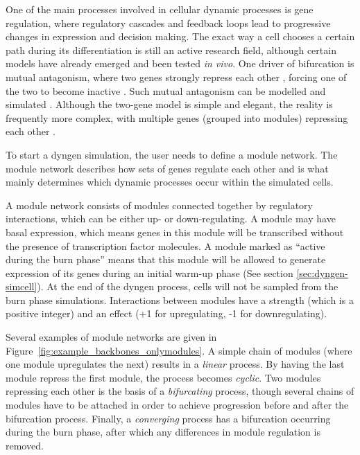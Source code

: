 \documentclass[
  table,
  10pt,
  a4paper]{article}
\begin{document}
One of the main processes involved in cellular dynamic processes is gene
regulation, where regulatory cascades and feedback loops lead to
progressive changes in expression and decision making. The exact way a
cell chooses a certain path during its differentiation is still an
active research field, although certain models have already emerged and
been tested \emph{in vivo}. One driver of bifurcation is mutual
antagonism, where two genes strongly repress each other
\autocite{rekhtman_directinteractionhematopoietic_1999,xu_regulationbifurcatingcell_2015},
forcing one of the two to become inactive
\autocite{graf_forcingcellschange_2009}. Such mutual antagonism can be
modelled and simulated
\autocite{wang_quantifyingwaddingtonlandscape_2011,ferrell_bistabilitybifurcationswaddington_2012}.
Although the two-gene model is simple and elegant, the reality is
frequently more complex, with multiple genes (grouped into modules)
repressing each other \autocite{yosef_dynamicregulatorynetwork_2013}.

To start a dyngen simulation, the user needs to define a module network.
The module network describes how sets of genes regulate each other and
is what mainly determines which dynamic processes occur within the
simulated cells.

A module network consists of modules connected together by regulatory
interactions, which can be either up- or down-regulating. A module may
have basal expression, which means genes in this module will be
transcribed without the presence of transcription factor molecules. A
module marked as ``active during the burn phase'' means that this module
will be allowed to generate expression of its genes during an initial
warm-up phase (See section \ref{sec:dyngen-simcell}). At the end of the
dyngen process, cells will not be sampled from the burn phase
simulations. Interactions between modules have a strength (which is a
positive integer) and an effect (+1 for upregulating, -1 for
downregulating).

Several examples of module networks are given in
Figure~\ref{fig:example_backbones_onlymodules}. A simple chain of
modules (where one module upregulates the next) results in a
\emph{linear} process. By having the last module repress the first
module, the process becomes \emph{cyclic}. Two modules repressing each
other is the basis of a \emph{bifurcating} process, though several
chains of modules have to be attached in order to achieve progression
before and after the bifurcation process. Finally, a \emph{converging}
process has a bifurcation occurring during the burn phase, after which
any differences in module regulation is removed.
\end{document}
